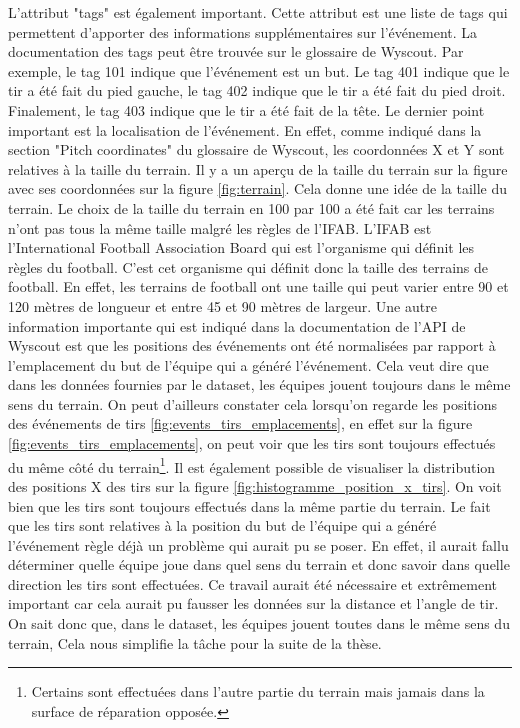 \documentclass[12pt]{article}
\begin{document}
L'attribut "tags" est également important.
Cette attribut est une liste de tags qui permettent d'apporter des informations supplémentaires sur l'événement.
La documentation des tags peut être trouvée sur le glossaire de Wyscout. \cite{WyscoutGlossary}
Par exemple, le tag 101 indique que l'événement est un but. 
Le tag 401 indique que le tir a été fait du pied gauche, le tag 402 indique que le tir a été fait du pied droit.
Finalement, le tag 403 indique que le tir a été fait de la tête.
\newline\newline
Le dernier point important est la localisation de l'événement.
En effet, comme indiqué dans la section "Pitch coordinates" du glossaire de Wyscout, \cite{WyscoutGlossary} les coordonnées X et Y sont relatives à la taille du terrain.
Il y a un aperçu de la taille du terrain sur la figure avec ses coordonnées sur la figure \ref{fig:terrain}.
Cela donne une idée de la taille du terrain.
Le choix de la taille du terrain en 100 par 100 a été fait car les terrains n'ont pas tous la même taille malgré les règles de l'IFAB.
\newline\newline
L'IFAB est l'International Football Association Board qui est l'organisme qui définit les règles du football. 
C'est cet organisme qui définit donc la taille des terrains de football.
En effet, les terrains de football ont une taille qui peut varier entre 90 et 120 mètres de longueur et entre 45 et 90 mètres de largeur. \cite{TerrainIFAB}
\newline\newline 
Une autre information importante qui est indiqué dans la documentation de l'API de Wyscout \cite{WyscoutAPI} est que les positions des événements ont été normalisées par rapport à l'emplacement du but de l'équipe qui a généré l'événement.
Cela veut dire que dans les données fournies par le dataset, les équipes jouent toujours dans le même sens du terrain.
On peut d'ailleurs constater cela lorsqu'on regarde les positions des événements de tirs \ref{fig:events_tirs_emplacements}, en effet sur la figure \ref{fig:events_tirs_emplacements}, on peut voir que les tirs sont toujours effectués du même côté du terrain\footnote{Certains sont effectuées dans l'autre partie du terrain mais jamais dans la surface de réparation opposée.}.
Il est également possible de visualiser la distribution des positions X des tirs sur la figure \ref{fig:histogramme_position_x_tirs}.
On voit bien que les tirs sont toujours effectués dans la même partie du terrain.
Le fait que les tirs sont relatives à la position du but de l'équipe qui a généré l'événement règle déjà un problème qui aurait pu se poser.
En effet, il aurait fallu déterminer quelle équipe joue dans quel sens du terrain et donc savoir dans quelle direction les tirs sont effectuées.
Ce travail aurait été nécessaire et extrêmement important car cela aurait pu fausser les données sur la distance et l'angle de tir.
\newline\newline
On sait donc que, dans le dataset, les équipes jouent toutes dans le même sens du terrain, Cela nous simplifie la tâche pour la suite de la thèse.
\end{document}
